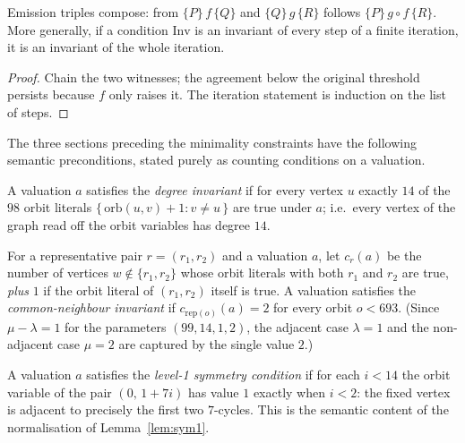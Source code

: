 \begin{lemma}\label{lem:enc-gtrip-comp}
Emission triples compose: from $\{P\}\,f\,\{Q\}$ and $\{Q\}\,g\,\{R\}$
follows $\{P\}\,g \circ f\,\{R\}$.  More generally, if a condition
$\mathrm{Inv}$ is an invariant of every step of a finite iteration, it is an
invariant of the whole iteration.
\leanok
{}
\end{lemma}

\begin{proof}\leanok
Chain the two witnesses; the agreement below the original threshold persists
because $f$ only raises it.  The iteration statement is induction on the list
of steps.
\end{proof}

The three sections preceding the minimality constraints have the following
semantic preconditions, stated purely as counting conditions on a valuation.

\begin{definition}\label{def:enc-deginv}
A valuation $a$ satisfies the \emph{degree invariant} if for every vertex
$u$ exactly $14$ of the $98$ orbit literals
$\{\,\mathrm{orb}(u,v)+1 : v \neq u\,\}$ are true under $a$; i.e.\ every
vertex of the graph read off the orbit variables has degree $14$.
\leanok
{}
\end{definition}

\begin{definition}\label{def:enc-cninv}
For a representative pair $r = (r_1,r_2)$ and a valuation $a$, let $c_r(a)$
be the number of vertices $w \notin \{r_1,r_2\}$ whose orbit literals with
both $r_1$ and $r_2$ are true, \emph{plus} $1$ if the orbit literal of
$(r_1,r_2)$ itself is true.  A valuation satisfies the
\emph{common-neighbour invariant} if $c_{\mathrm{rep}(o)}(a) = 2$ for every
orbit $o < 693$.  (Since $\mu - \lambda = 1$ for the parameters
$(99,14,1,2)$, the adjacent case $\lambda = 1$ and the non-adjacent case
$\mu = 2$ are captured by the single value $2$.)
\leanok
{}
\end{definition}

\begin{definition}\label{def:enc-sym1holds}
A valuation $a$ satisfies the \emph{level-1 symmetry condition} if for each
$i < 14$ the orbit variable of the pair $(0,\, 1 + 7i)$ has value $1$ exactly
when $i < 2$: the fixed vertex is adjacent to precisely the first two
$7$-cycles.  This is the semantic content of the normalisation of
Lemma~\ref{lem:sym1}.
\leanok
{}
\end{definition}

